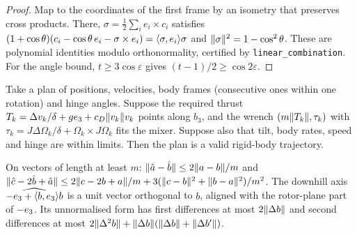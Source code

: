 \begin{proof}
\leanok
Map to the coordinates of the first frame by an isometry that preserves cross
products. There, $\sigma=\tfrac12\sum_i e_i\times c_i$ satisfies
$(1+\cos\theta)(c_i-\cos\theta\,e_i-\sigma\times e_i)=\langle \sigma, e_i \rangle\sigma$ and
$\lVert \sigma \rVert^2=1-\cos^2\theta$. These are polynomial identities modulo
orthonormality, certified by \texttt{linear\_combination}. For the angle bound,
$t\ge3\cos\varepsilon$ gives $(t-1)/2\ge\cos2\varepsilon$.
\end{proof}

\begin{theorem}
\label{thm:lifting}
\leanok
{}
Take a plan of positions, velocities, body frames (consecutive ones within one
rotation) and hinge angles. Suppose the required thrust
$T_k=\Delta v_k/\delta+ge_3+c_D\lVert v_k \rVert v_k$ points along $b_3$, and the wrench
$(m\lVert T_k \rVert,\tau_k)$ with $\tau_k=J\Delta\Omega_k/\delta+\Omega_k\times J\Omega_k$ fits
the mixer. Suppose also that tilt, body rates, speed and hinge are within limits.
Then the plan is a valid rigid-body trajectory.
\end{theorem}

\begin{lemma}
\label{lem:regularity}
\leanok
On vectors of length at least $m$:
$\lVert \hat a-\hat b \rVert\le2\lVert a-b \rVert/m$ and
$\lVert \hat c-2\hat b+\hat a \rVert\le2\lVert c-2b+a \rVert/m+3(\lVert c-b \rVert^2+\lVert b-a \rVert^2)/m^2$.
The downhill axis $\widehat{-e_3+\langle b, e_3 \rangle b}$ is a unit vector orthogonal to $b$,
aligned with the rotor-plane part of $-e_3$. Its unnormalised form has first
differences at most $2\lVert \Delta b \rVert$ and second differences at most
$2\lVert \Delta^2b \rVert+\lVert \Delta b \rVert(\lVert \Delta b \rVert+\lVert \Delta b' \rVert)$.
\end{lemma}


